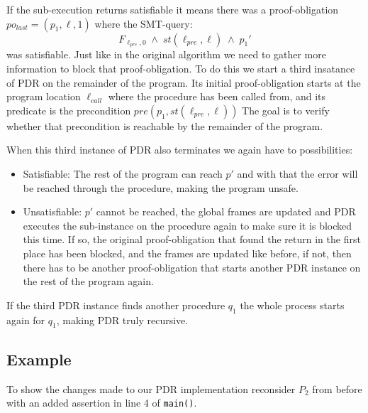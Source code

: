 \documentclass{article}
\begin{document}
	If the sub-execution returns satisfiable it means there was a proof-obligation $po_{last} = (p_1, \ell, 1)$ where the SMT-query:
	\begin{equation}
		F_{\ell_{pre}, 0} \; \land \; st(\ell_{pre}, \ell) \; \land \; p_1'
	\end{equation}
	was satisfiable. Just like in the original algorithm we need to gather more information to block that proof-obligation. To do this we start a third insatance of PDR on the remainder of the program. Its initial proof-obligation starts at the program location $\ell_{call}$ where the procedure has been called from, and its predicate is the precondition $pre(p_1, st(\ell_{pre}, \ell))$
	The goal is to verify whether that precondition is reachable by the remainder of the program. \\ \par
	When this third instance of PDR also terminates we again have to possibilities: 
	\begin{itemize}
		\item Satisfiable: The rest of the program can reach $p'$ and with that the error will be reached through the procedure, making the program unsafe.
		\item Unsatisfiable: $p'$ cannot be reached, the global frames are updated and PDR executes the sub-instance on the procedure again to make sure it is blocked this time. If so, the original proof-obligation that found the return in the first place has been blocked, and the frames are updated like before, if not, then there has to be another proof-obligation that starts another PDR instance on the rest of the program again.
	\end{itemize}
	If the third PDR instance finds another procedure $q_1$ the whole process starts again for $q_1$, making PDR truly recursive.
	
	
	
	\subsection{Example}
	To show the changes made to our PDR implementation reconsider $P_2$ from before with an added assertion in line 4 of \texttt{main()}.\\
	
\end{document}
